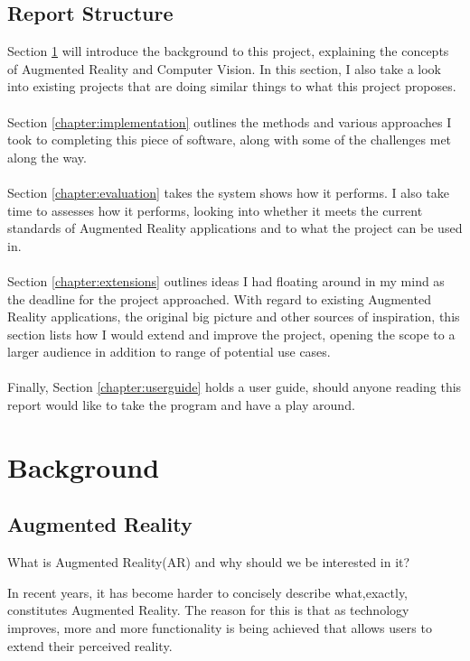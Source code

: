\documentclass[11pt]{article}
\begin{document}
\subsection{Report Structure}
Section \ref{chapter:background} will introduce the background to this
project, explaining the concepts of Augmented Reality and Computer
Vision. In this section, I also take a look into existing
projects that are doing similar things to what this project proposes.\\
\\
Section \ref{chapter:implementation} outlines the methods and various
approaches I took to completing this piece of software, along with
some of the challenges met along the way.\\
\\
Section \ref{chapter:evaluation} takes the system shows how it performs.
I also take time to assesses how it
performs, looking into whether it meets the current standards of 
Augmented Reality applications and to what the project can be used in.\\
\\
Section \ref{chapter:extensions} outlines ideas I had floating around in my
mind as the deadline for the project approached. With regard to existing
Augmented Reality applications, the original big picture and other
sources of inspiration, this section lists how I would extend and improve
the project, opening the scope to a larger audience in addition to range
of potential use cases.\\
\\
Finally, Section \ref{chapter:userguide} holds a user guide, should anyone
reading this report would like to take the program and have a play around.

\newpage
\section{Background}
\label{chapter:background}

\subsection{Augmented Reality}
\begin{center}
What is Augmented Reality(AR) and why should we be interested in it? \\
\end{center}
In recent years, it has become harder to concisely describe what,exactly, 
constitutes Augmented Reality. The reason for this is that as technology
improves, more and more functionality is being achieved that allows 
users to extend their perceived reality.\\ 
\end{document}
